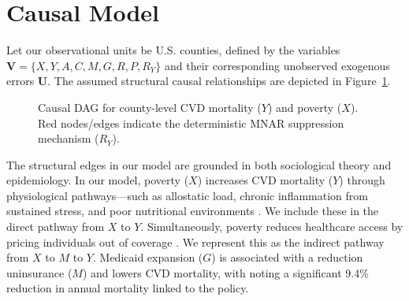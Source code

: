 \documentclass{article}
\theoremstyle{plain}
\theoremstyle{definition}
\theoremstyle{remark}
\begin{document}
\section{Causal Model}
\label{causal_model}

Let our observational units be U.S. counties, defined by the variables 
$\mathbf{V} = \{X, Y, A, C, M, G, R, P, R_Y\}$ and their corresponding 
unobserved exogenous errors $\mathbf{U}$. The assumed structural causal 
relationships are depicted in Figure~\ref{fig:dag}. 

\begin{figure}[ht]
\centering
{}
\caption{Causal DAG for county-level CVD mortality ($Y$) and poverty ($X$). 
Red nodes/edges indicate the deterministic MNAR suppression mechanism ($R_Y$).}
\label{fig:dag}
\end{figure}

The structural edges in our model are grounded in both sociological 
theory and epidemiology. In our model, poverty ($X$)  increases CVD 
mortality ($Y$) through physiological pathways—such as allostatic load, chronic 
inflammation from sustained stress, and poor nutritional environments 
\citep{kim2025mediating}. We include these in the direct pathway from $X$ to $Y$. Simultaneously, poverty reduces healthcare 
access by pricing individuals out of coverage \citep{khatana2019association}. We represent this as the indirect pathway from $X$ to $M$ to $Y$.
Medicaid expansion ($G$) is associated with a 
reduction uninsurance ($M$) and lowers CVD mortality, with 
\citet{miller2021medicaid} noting a significant 9.4\% reduction in annual mortality 
linked to the policy. 
\end{document}
